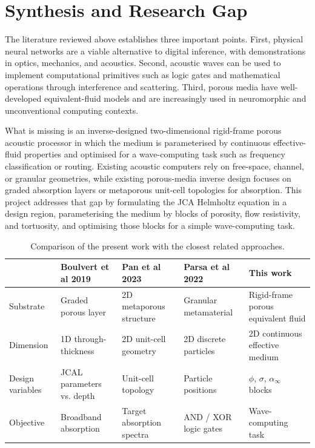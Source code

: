 \section{Synthesis and Research Gap}
\label{sec:lit_synthesis}

The literature reviewed above establishes three important points. First, physical neural networks are a viable alternative to digital inference, with demonstrations in optics, mechanics, and acoustics. Second, acoustic waves can be used to implement computational primitives such as logic gates and mathematical operations through interference and scattering. Third, porous media have well-developed equivalent-fluid models and are increasingly used in neuromorphic and unconventional computing contexts.

What is missing is an inverse-designed two-dimensional rigid-frame porous acoustic processor in which the medium is parameterised by continuous effective-fluid properties and optimised for a wave-computing task such as frequency classification or routing. Existing acoustic computers rely on free-space, channel, or granular geometries, while existing porous-media inverse design focuses on graded absorption layers or metaporous unit-cell topologies for absorption. This project addresses that gap by formulating the JCA Helmholtz equation in a design region, parameterising the medium by blocks of porosity, flow resistivity, and tortuosity, and optimising those blocks for a simple wave-computing task.

\begin{table}[htbp]
\centering
\caption{Comparison of the present work with the closest related approaches.}
\label{tab:closest_work}
\begin{tabular}{@{}>{\raggedright}p{2.4cm}>{\raggedright}p{2.8cm}>{\raggedright}p{2.8cm}>{\raggedright}p{2.8cm}>{\raggedright\arraybackslash}p{2.4cm}@{}}
\toprule
& \textbf{Boulvert et al 2019} & \textbf{Pan et al 2023} & \textbf{Parsa et al 2022} & \textbf{This work} \\
\midrule
Substrate & Graded porous layer & 2D metaporous structure & Granular metamaterial & Rigid-frame porous equivalent fluid \\
Dimension & 1D through-thickness & 2D unit-cell geometry & 2D discrete particles & 2D continuous effective medium \\
Design variables & JCAL parameters vs. depth & Unit-cell topology & Particle positions & $\phi$, $\sigma$, $\alpha_\infty$ blocks \\
Objective & Broadband absorption & Target absorption spectra & AND / XOR logic gates & Wave-computing task \\
\bottomrule
\end{tabular}
\end{table}

 